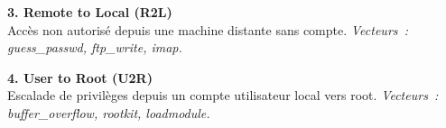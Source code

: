 \documentclass{article}
\newlength{\colW}  \setlength{\colW}{180mm}
\newlength{\gapW}  \setlength{\gapW}{15mm}
\newcommand{\bodyfont}{\fontsize{15.3}{20.5}\selectfont}
\newcommand{\smallfont}{\fontsize{13.5}{18}\selectfont}
\begin{document}
\begin{minipage}[t]{\colW}
\begin{tcolorbox}[pc, title={\faBug\; Typologie des Attaques}]
\vspace{4mm}
\bodyfont\color{TextMain}
\textbf{\textcolor{R2LColor}{3. Remote to Local (R2L)}} \\
\smallfont\color{TextMuted} Acc\`es non autoris\'e depuis une machine distante sans compte.
\textit{Vecteurs~: guess\_passwd, ftp\_write, imap.}

\vspace{4mm}
\bodyfont\color{TextMain}
\textbf{\textcolor{U2RColor}{4. User to Root (U2R)}} \\
\smallfont\color{TextMuted} Escalade de privil\`eges depuis un compte utilisateur local vers root.
\textit{Vecteurs~: buffer\_overflow, rootkit, loadmodule.}
\end{tcolorbox}

\end{minipage}%
\hspace{\gapW}%
\end{document}

